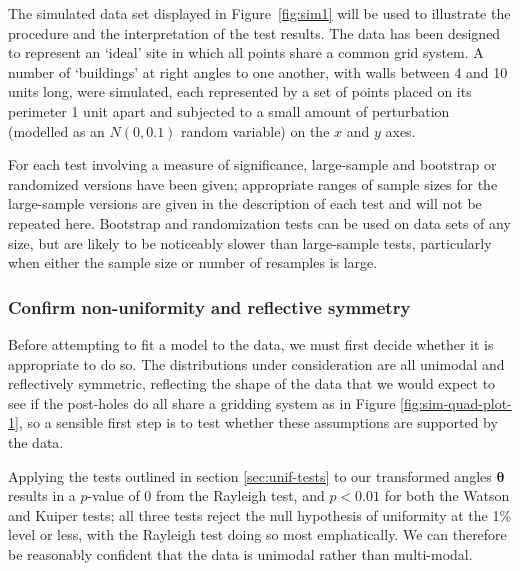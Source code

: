 \documentclass[../../ArchStats.tex]{subfiles}
\begin{document}
The simulated data set displayed in Figure~\ref{fig:sim1} will be used to illustrate the procedure and the interpretation of the test results. The data has been designed to represent an `ideal' site in which all points share a common grid system. A number of `buildings' at right angles to one another, with walls between 4 and 10 units long, were simulated, each represented by a set of points placed on its perimeter 1 unit apart and subjected to a small amount of perturbation (modelled as an $N(0,0.1)$ random variable) on the $x$ and $y$ axes.

For each test involving a measure of significance, large-sample and bootstrap or randomized versions have been given; appropriate ranges of sample sizes for the large-sample versions are given in the description of each test and will not be repeated here. Bootstrap and randomization tests can be used on data sets of any size, but are likely to be noticeably slower than large-sample tests, particularly when either the sample size or number of resamples is large. 


\subsubsection{Confirm non-uniformity and reflective symmetry}
\label{sssec:unif-test}
Before attempting to fit a model to the data, we must first decide whether it is appropriate to do so. The distributions under consideration are all unimodal and reflectively symmetric, reflecting the shape of the data that we would expect to see if the post-holes do all share a gridding system as in Figure \ref{fig:sim-quad-plot-1}, so a sensible first step is to test whether these assumptions are supported by the data. 

Applying the tests outlined in section \ref{sec:unif-tests} to our transformed angles $\boldsymbol{\theta}$ results in a $p$-value of 0 from the Rayleigh test, and $p < 0.01$ for both the Watson and Kuiper tests; all three tests reject the null hypothesis of uniformity at the 1\% level or less, with the Rayleigh test doing so most emphatically. We can therefore be reasonably confident that the data is unimodal rather than multi-modal.
\end{document}
